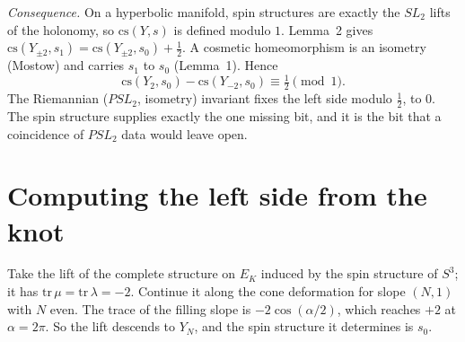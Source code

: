 \documentclass[10pt]{amsart}
\newcommand{\st}[1]{\par\noindent\textit{#1}\enspace}
\begin{document}
\st{Consequence.} On a hyperbolic manifold, spin structures are exactly the $SL_2$ lifts of the holonomy, so
$\mathrm{cs}(Y,s)$ is defined modulo $1$. Lemma~2 gives $\mathrm{cs}(Y_{\pm2},s_1)=\mathrm{cs}(Y_{\pm2},s_0)+\tfrac12$.
A cosmetic homeomorphism is an isometry (Mostow) and carries $s_1$ to $s_0$ (Lemma~1). Hence
\[
\mathrm{cs}(Y_2,s_0)-\mathrm{cs}(Y_{-2},s_0)\equiv\tfrac12\pmod 1 .
\]
The Riemannian ($PSL_2$, isometry) invariant fixes the left side modulo $\tfrac12$, to $0$. The spin structure supplies exactly the one
missing bit, and it is the bit that a coincidence of $PSL_2$ data would leave open.

\section{Computing the left side from the knot}

\begin{lem}
Take the lift of the complete structure on $E_K$ induced by the spin structure of $S^3$; it has
$\mathrm{tr}\,\mu=\mathrm{tr}\,\lambda=-2$. Continue it along the cone deformation for slope $(N,1)$ with $N$ even.
The trace of the filling slope is $-2\cos(\alpha/2)$, which reaches $+2$ at $\alpha=2\pi$.
So the lift descends to $Y_N$, and the spin structure it determines is $s_0$.
\end{lem}
\end{document}

